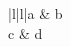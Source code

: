 \documentclass{article}
\begin{document}
\begin{tblr}{|l|l|}\hline a & b\\[\baselineskip] c & d\\\hline\end{tblr}
\end{document}

